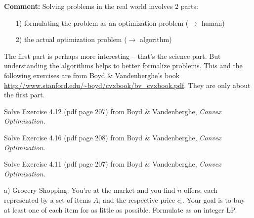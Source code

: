 

\renewcommand{\course}{Maths for Intelligent Systems}
\renewcommand{\coursedate}{Summer 2019}

\renewcommand{\exnum}{Exercise 9 LEFT OUT}

\exercises


\exercisestitle



\textbf{Comment:} Solving problems in the real world involves 2 parts:
\begin{enumerate}
\item[1)] formulating the problem as an optimization problem ($\to$ human)
\item[2)] the actual optimization problem ($\to$ algorithm)
\end{enumerate}
The first part is perhaps more interesting -- that's the science
part. But understanding the algorithms helps to better formalize
problems. This and the following exercises are from Boyd \&
Vandenberghe's book
\url{http://www.stanford.edu/~boyd/cvxbook/bv_cvxbook.pdf}. They are only about the first part.


Solve Exercise 4.12 (pdf page 207) from  Boyd \& Vandenberghe,
\emph{Convex Optimization.}



Solve Exercise 4.16 (pdf page 208) from  Boyd \& Vandenberghe,
\emph{Convex Optimization.}



Solve Exercise 4.11 (pdf page 207) from  Boyd \& Vandenberghe,
\emph{Convex Optimization.}



a) Grocery Shopping: You're at the market and you find $n$ offers,
each represented by a set of items $A_i$ and the respective price
$c_i$. Your goal is to buy at least one of each item for as little as
possible. Formulate as an integer LP.

